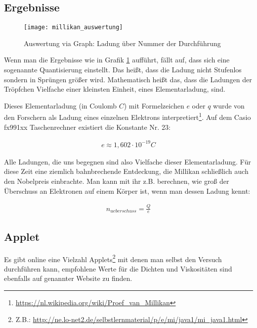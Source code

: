 \subsection{Ergebnisse}

\begin{figure}[h!]
	\center
	\texttt{[image: millikan\_auswertung]}
	\caption{Auswertung via Graph: Ladung über Nummer der Durchführung}
	\vspace*{-10pt}
	\label{fig:millikan_auswertung}
\end{figure}

Wenn man die Ergebnisse wie in Grafik \ref{fig:millikan_auswertung} aufführt, fällt auf, dass sich eine sogenannte Quantisierung einstellt. Das heißt, dass die Ladung nicht \glqq Stufenlos\grqq{} sondern in \glqq Sprüngen\grqq{} größer wird. Mathematisch heißt das, dass die Ladungen der Tröpfchen Vielfache einer kleinsten Einheit, eines \glqq Elementarladung\grqq , sind. 

Dieses Elementarladung (in Coulomb $C$) mit Formelzeichen $e$ oder $q$ wurde von den Forschern als Ladung eines einzelnen Elektrons interpretiert\footnote{\url{https://nl.wikipedia.org/wiki/Proef_van_Millikan}}. Auf dem Casio fx991xx Taschenrechner existiert die Konstante Nr. 23:

\begin{align}
	e \approx 1,602 \cdot 10^{-19} C
\end{align}

Alle Ladungen, die uns begegnen sind also Vielfache dieser Elementarladung. Für diese Zeit eine ziemlich bahnbrechende Entdeckung, die Millikan schließlich auch den Nobelpreis einbrachte. Man kann mit ihr z.B. berechnen, wie groß der Überschuss an Elektronen auf einem Körper ist, wenn man dessen Ladung kennt:

\begin{align}
	n_{ueberschuss} = \frac{Q}{e}
\end{align}


\subsection{Applet}

Es gibt online eine Vielzahl Applets\footnote{Z.B.: \url{http://ne.lo-net2.de/selbstlernmaterial/p/e/mi/java1/mi_java1.html}} mit denen man selbst den Versuch durchführen kann, empfohlene Werte für die Dichten und Viskositäten sind ebenfalls auf genannter Website zu finden.





